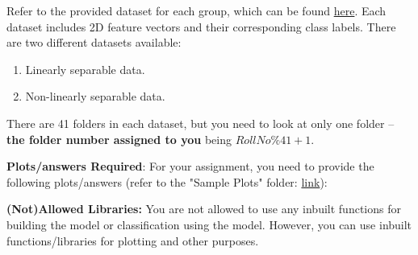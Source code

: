 \documentclass[solution,addpoints,12pt]{exam}
\begin{document}
\begin{questions}
Refer to the provided dataset for each group, which can be found  \href{https://drive.google.com/drive/folders/1NmqA9lkxXayVaCzEfRgSxSxCYSa0LEZu?usp=sharing}{here}. Each dataset includes 2D feature vectors and their corresponding class labels. There are two different datasets available:
\begin{enumerate}
    \item Linearly separable data.
    \item Non-linearly separable data.
\end{enumerate}
There are 41 folders in each dataset, but you need to look at only one folder -- {\bf the folder number assigned to you} being $RollNo\%41 + 1$.
    
\textbf{Plots/answers Required}:
For your assignment, you need to provide the following plots/answers (refer to the "Sample Plots" folder: \href{https://drive.google.com/drive/folders/1jhauePXVWVnmUEkmZeutuhlzosTRz1sU?usp=sharing}{link}):
    
    
\textbf{(Not)Allowed Libraries:}
You are not allowed to use any inbuilt functions for building the model or classification using the model. However, you can use inbuilt functions/libraries for plotting and other purposes.
\end{questions}
\end{document}
